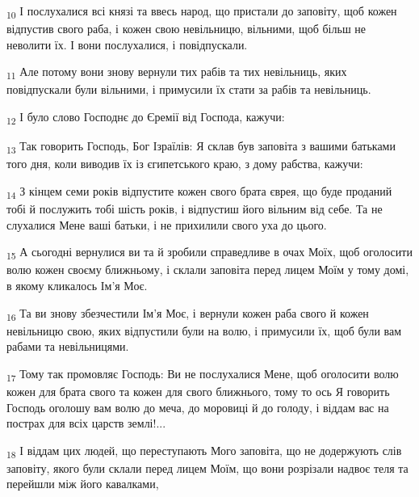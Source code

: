 \begin{tcolorbox}
\textsubscript{10} І послухалися всі князі та ввесь народ, що пристали до заповіту, щоб кожен відпустив свого раба, і кожен свою невільницю, вільними, щоб більш не неволити їх. І вони послухалися, і повідпускали.
\end{tcolorbox}
\begin{tcolorbox}
\textsubscript{11} Але потому вони знову вернули тих рабів та тих невільниць, яких повідпускали були вільними, і примусили їх стати за рабів та невільниць.
\end{tcolorbox}
\begin{tcolorbox}
\textsubscript{12} І було слово Господнє до Єремії від Господа, кажучи:
\end{tcolorbox}
\begin{tcolorbox}
\textsubscript{13} Так говорить Господь, Бог Ізраїлів: Я склав був заповіта з вашими батьками того дня, коли виводив їх із єгипетського краю, з дому рабства, кажучи:
\end{tcolorbox}
\begin{tcolorbox}
\textsubscript{14} З кінцем семи років відпустите кожен свого брата єврея, що буде проданий тобі й послужить тобі шість років, і відпустиш його вільним від себе. Та не слухалися Мене ваші батьки, і не прихилили свого уха до цього.
\end{tcolorbox}
\begin{tcolorbox}
\textsubscript{15} А сьогодні вернулися ви та й зробили справедливе в очах Моїх, щоб оголосити волю кожен своєму ближньому, і склали заповіта перед лицем Моїм у тому домі, в якому кликалось Ім'я Моє.
\end{tcolorbox}
\begin{tcolorbox}
\textsubscript{16} Та ви знову збезчестили Ім'я Моє, і вернули кожен раба свого й кожен невільницю свою, яких відпустили були на волю, і примусили їх, щоб були вам рабами та невільницями.
\end{tcolorbox}
\begin{tcolorbox}
\textsubscript{17} Тому так промовляє Господь: Ви не послухалися Мене, щоб оголосити волю кожен для брата свого та кожен для свого ближнього, тому то ось Я говорить Господь оголошу вам волю до меча, до моровиці й до голоду, і віддам вас на пострах для всіх царств землі!...
\end{tcolorbox}
\begin{tcolorbox}
\textsubscript{18} І віддам цих людей, що переступають Мого заповіта, що не додержують слів заповіту, якого були склали перед лицем Моїм, що вони розрізали надвоє теля та перейшли між його кавалками,
\end{tcolorbox}
